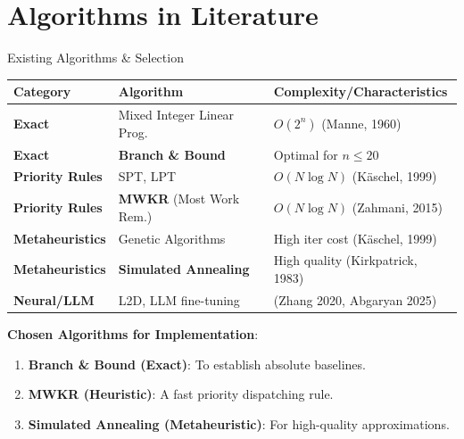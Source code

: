 \documentclass{beamer}
\begin{document}
\section{Algorithms in Literature}

\begin{frame}{Existing Algorithms \& Selection}
    \small
    \begin{tabular}{|p{}|p{}|p{}|}
        \hline
        \rowcolor{MyHeaderBG} \color{white}\textbf{Category} & \color{white}\textbf{Algorithm} & \color{white}\textbf{Complexity/Characteristics} \\ \hline
        \textbf{Exact} & Mixed Integer Linear Prog. & $O(2^n)$ (Manne, 1960) \\ \hline
        \textbf{Exact} & \textbf{Branch \& Bound} & Optimal for $n \le 20$ \\ \hline
        \textbf{Priority Rules} & SPT, LPT & $O(N \log N)$ (Käschel, 1999) \\ \hline
        \textbf{Priority Rules} & \textbf{MWKR} (Most Work Rem.) & $O(N \log N)$ (Zahmani, 2015) \\ \hline
        \textbf{Metaheuristics} & Genetic Algorithms & High iter cost (Käschel, 1999) \\ \hline
        \textbf{Metaheuristics} & \textbf{Simulated Annealing} & High quality (Kirkpatrick, 1983) \\ \hline
        \textbf{Neural/LLM} & L2D, LLM fine-tuning & (Zhang 2020, Abgaryan 2025) \\ \hline
    \end{tabular}
    
    \pause
    \vspace{1em}
    \textbf{Chosen Algorithms for Implementation}:
    \begin{enumerate}
        \item \textbf{Branch \& Bound (Exact)}: To establish absolute baselines.
        \item \textbf{MWKR (Heuristic)}: A fast priority dispatching rule.
        \item \textbf{Simulated Annealing (Metaheuristic)}: For high-quality approximations.
    \end{enumerate}
\end{frame}
\end{document}
